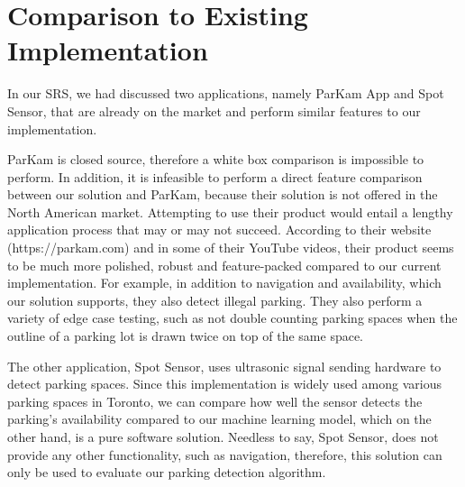 \documentclass[12pt, titlepage]{article}
\begin{document}
\newpage
\section{Comparison to Existing Implementation}	

In our SRS, we had discussed two applications, namely ParKam App and Spot
Sensor, that are already on the market and perform similar features to our
implementation. 

ParKam is closed source, therefore a white box comparison is impossible to
perform. In addition, it is infeasible to perform a direct feature comparison
between our solution and ParKam, because their solution is not offered in the
North American market. Attempting to use their product would entail a lengthy
application process that may or may not succeed. According to their website
(https://parkam.com) and in some of their YouTube videos, their product seems to
be much more polished, robust and feature-packed compared to our current
implementation. For example, in addition to navigation and availability, which
our solution supports, they also detect illegal parking. They also perform a
variety of edge case testing, such as not double counting parking spaces when
the outline of a parking lot is drawn twice on top of the same space.

The other application, Spot Sensor, uses ultrasonic signal sending hardware to
detect parking spaces. Since this implementation is widely used among various
parking spaces in Toronto, we can compare how well the sensor detects the
parking's availability compared to our machine learning model, which on the
other hand, is a pure software solution. Needless to say, Spot Sensor, does not
provide any other functionality, such as navigation, therefore, this solution
can only be used to evaluate our parking detection algorithm.

\newpage
\color{red}
\end{document}
